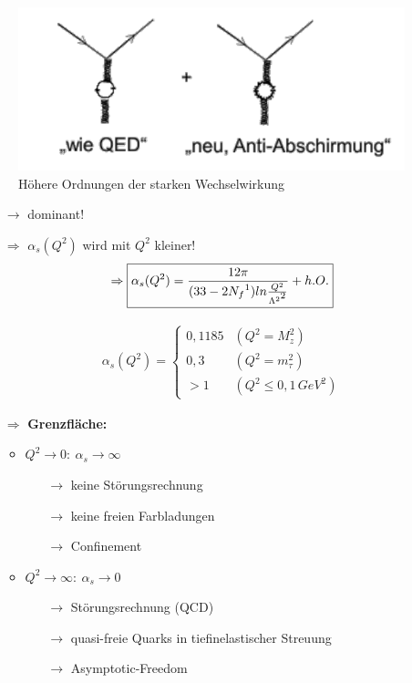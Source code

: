 \begin{itemize}
\begin{figure}[!ht]
\centering
\includegraphics[width=.5\textwidth]{imgs/ep5-fig-7-12.pdf}
\caption{Höhere Ordnungen der starken Wechselwirkung \label{fig:7.12}}
\end{figure}
\begin{itemize}
\item[$\rightarrow$] dominant!
\item[$\Rightarrow$] $\alpha_s(Q^2)$ wird mit $Q^2$ kleiner!
\begin{align}
\Rightarrow \text{\fbox{$\alpha_s(Q^2)=\frac{12\pi}{(33-2N_f\footnotemark)ln\frac{Q^2}{\Lambda^2\footnotemark}}+h.O.$}} 
\end{align}
\begin{align}
\alpha_s(Q^2)=
\begin{cases}
0,1185 & (Q^2=M^2_z)\\
0,3 & (Q^2=m^2_\tau)\\
>1 & (Q^2\leq 0,1\, GeV^2)
\end{cases}
\end{align}
\item[$\Rightarrow$] \textbf{Grenzfläche:}
\begin{itemize}
\item $Q^2\rightarrow 0:\ \alpha_s\rightarrow\infty$
\begin{itemize}
\item[$\rightarrow$] keine Störungsrechnung
\item[$\rightarrow$] keine freien Farbladungen
\item[$\rightarrow$] \grqq Confinement \grqq\
\end{itemize}
\item $Q^2\rightarrow \infty:\ \alpha_s \rightarrow 0$
\begin{itemize}
\item[$\rightarrow$] Störungsrechnung (QCD)
\item[$\rightarrow$] \grqq quasi-freie\grqq{} Quarks in tiefinelastischer Streuung
\item[$\rightarrow$] \grqq Asymptotic-Freedom\grqq\
\end{itemize}
\end{itemize}
\end{itemize}
\end{itemize}

